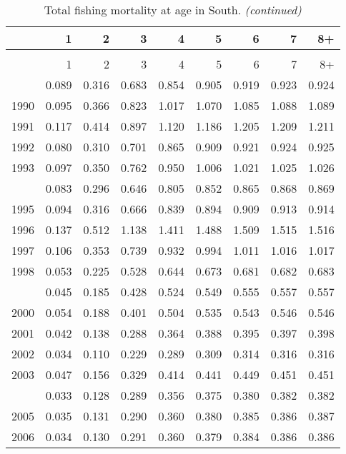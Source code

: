 \documentclass[
]{article}
\begin{document}
\begin{longtable}[t]{lrrrrrrrr}
\caption{\label{tab:South-region-FAA-table}Total fishing mortality at age in South.}\\
\toprule
  & 1 & 2 & 3 & 4 & 5 & 6 & 7 & 8+\\
\midrule
\endfirsthead
\caption[]{Total fishing mortality at age in South. \textit{(continued)}}\\
\toprule
  & 1 & 2 & 3 & 4 & 5 & 6 & 7 & 8+\\
\midrule
\endhead

\endfoot
\bottomrule
\endlastfoot
1989 & 0.089 & 0.316 & 0.683 & 0.854 & 0.905 & 0.919 & 0.923 & 0.924\\
1990 & 0.095 & 0.366 & 0.823 & 1.017 & 1.070 & 1.085 & 1.088 & 1.089\\
1991 & 0.117 & 0.414 & 0.897 & 1.120 & 1.186 & 1.205 & 1.209 & 1.211\\
1992 & 0.080 & 0.310 & 0.701 & 0.865 & 0.909 & 0.921 & 0.924 & 0.925\\
1993 & 0.097 & 0.350 & 0.762 & 0.950 & 1.006 & 1.021 & 1.025 & 1.026\\
\addlinespace
1994 & 0.083 & 0.296 & 0.646 & 0.805 & 0.852 & 0.865 & 0.868 & 0.869\\
1995 & 0.094 & 0.316 & 0.666 & 0.839 & 0.894 & 0.909 & 0.913 & 0.914\\
1996 & 0.137 & 0.512 & 1.138 & 1.411 & 1.488 & 1.509 & 1.515 & 1.516\\
1997 & 0.106 & 0.353 & 0.739 & 0.932 & 0.994 & 1.011 & 1.016 & 1.017\\
1998 & 0.053 & 0.225 & 0.528 & 0.644 & 0.673 & 0.681 & 0.682 & 0.683\\
\addlinespace
1999 & 0.045 & 0.185 & 0.428 & 0.524 & 0.549 & 0.555 & 0.557 & 0.557\\
2000 & 0.054 & 0.188 & 0.401 & 0.504 & 0.535 & 0.543 & 0.546 & 0.546\\
2001 & 0.042 & 0.138 & 0.288 & 0.364 & 0.388 & 0.395 & 0.397 & 0.398\\
2002 & 0.034 & 0.110 & 0.229 & 0.289 & 0.309 & 0.314 & 0.316 & 0.316\\
2003 & 0.047 & 0.156 & 0.329 & 0.414 & 0.441 & 0.449 & 0.451 & 0.451\\
\addlinespace
2004 & 0.033 & 0.128 & 0.289 & 0.356 & 0.375 & 0.380 & 0.382 & 0.382\\
2005 & 0.035 & 0.131 & 0.290 & 0.360 & 0.380 & 0.385 & 0.386 & 0.387\\
2006 & 0.034 & 0.130 & 0.291 & 0.360 & 0.379 & 0.384 & 0.386 & 0.386\\

\end{longtable}
\end{document}
